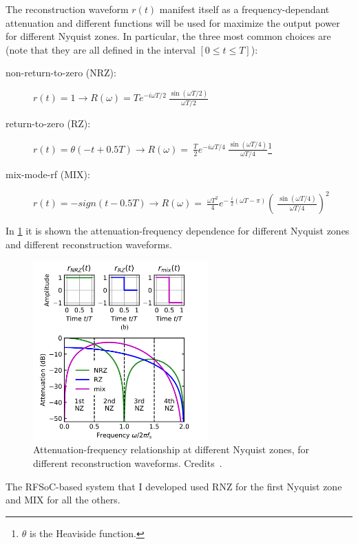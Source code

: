 The reconstruction waveform $r(t)$ manifest itself as a frequency-dependant attenuation and different functions will be used for maximize the output power for different Nyquist zones. In particular, the three most common choices are (note that they are all defined in the interval $[0\le t \le T]$):
\begin{description}
    \item[non-return-to-zero (NRZ):] $r(t) = 1\rightarrow R(\omega)=Te^{-i\omega T / 2}\ \frac{\sin\left(\omega T / 2\right)}{\omega T / 2}$
    \item[return-to-zero (RZ):] $r(t) = \theta (-t+0.5T)\rightarrow R(\omega) = \ \frac{T}{2}e^{-i\omega T/4} \ \frac{\sin(\omega T / 4)}{\omega T / 4}$\footnote{$\theta$ is the Heaviside function.}
    \item[mix-mode-rf (MIX):] $r(t) = -sign(t - 0.5T) \rightarrow R(\omega) = \ \frac{\omega T^2}{4}e^{-\ \frac{i}{2}(\omega T - \pi)}\left(\ \frac{\sin(\omega T / 4)}{\omega T / 4}\right)^2$
\end{description}

In \cref{fig:dac-modes} it is shown the attenuation-frequency dependence for different Nyquist zones and different reconstruction waveforms.

\begin{figure}[ht]
    \centering
    \includegraphics[width=0.6\textwidth]{Setup-software/figures/DAC_modes.png}
    \caption[Attenuation-frequency relationship at different Nyquist zones, for different reconstruction waveforms]{Attenuation-frequency relationship at different Nyquist zones, for different reconstruction waveforms. Credits~\cite{Kalfus2020}.}
    \label{fig:dac-modes}
\end{figure}

The RFSoC-based system that I developed used RNZ for the first Nyquist zone and MIX for all the others.

